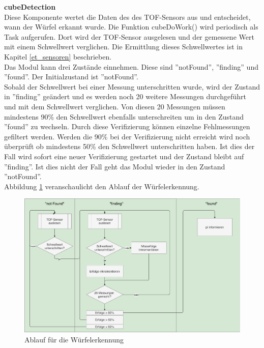 \documentclass[../../main.tex]{subfiles}
\begin{document}
    \textbf{cubeDetection}\\
    Diese Komponente wertet die Daten des des TOF-Sensors aus und entscheidet, wann der Würfel erkannt wurde. Die Funktion cubeDoWork() wird periodisch als Task aufgerufen. Dort wird der TOF-Sensor ausgelesen und der gemessene Wert mit einem Schwellwert verglichen. Die Ermittlung dieses Schwellwertes ist in Kapitel \ref{et_sensoren} beschrieben.\\
    Das Modul kann drei Zustände einnehmen. Diese sind ''notFound'', ''finding'' und ''found''. Der Initialzustand ist ''notFound''.\\
    Sobald der Schwellwert bei einer Messung unterschritten wurde, wird der Zustand in ''finding'' geändert und es werden noch 20 weitere Messungen durchgeführt und mit dem Schwellwert verglichen. Von diesen 20 Messungen müssen mindestens 90\% den Schwellwert ebenfalls unterschreiten um in den Zustand ''found'' zu wechseln. Durch diese Verifizierung können einzelne Fehlmessungen gefiltert werden. Werden die 90\% bei der Verifizierung nicht erreicht wird noch überprüft ob mindestens 50\% den Schwellwert unterschritten haben. Ist dies der Fall wird sofort eine neuer Verifizierung gestartet und der Zustand bleibt auf ''finding''. Ist dies nicht der Fall geht das Modul wieder in den Zustand ''notFound''.\\
    Abbildung \ref{fig:et_cube_detection_proc} veranschaulicht den Ablauf der Würfelerkennung.

    \begin{figure}[H]
        \centering
        \includegraphics[width=1.0\textwidth]{../../images/et/et_cube_detection_proc.pdf}
        \caption {Ablauf für die Würfelerkennung}
        \label{fig:et_cube_detection_proc}
    \end{figure}
\end{document}
